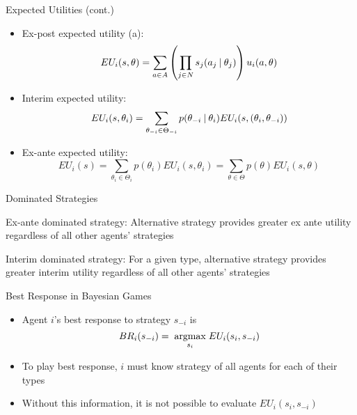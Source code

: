 \documentclass[11pt,aspectratio=169]{beamer}
\begin{document}
  \begin{frame}{Expected Utilities (cont.)}
   \begin{itemize}[<+->]
    \item \alert{Ex-post} expected utility (a):
    $$EU_i(s,\theta) = \sum_{a\in A}\left(\prod_{j\in N}s_j(a_j \:\vert\: \theta_j)\right) u_i(a,\theta)$$
    \item \alert{Interim} expected utility:
    $$EU_i(s,\theta_i) = \sum_{\theta_{-i}\in \Theta_{-i}} p(\theta_{-i} \:\vert\: \theta_i) EU_i(s, (\theta_i,\theta_{-i}))$$
    \item \alert{Ex-ante} expected utility:
    $$EU_i(s)=\sum_{\theta_i \in \Theta_i} p(\theta_i) EU_i(s,\theta_i) = \sum_{\theta \in \Theta} p(\theta) EU_i(s, \theta)$$
   \end{itemize}
  \end{frame}
  
  
  \begin{frame}{Dominated Strategies}
   \begin{itemizes}[1.5em]
    \item \alert{Ex-ante dominated strategy}: Alternative strategy provides greater ex ante utility regardless of all other agents' strategies
    \item \alert{Interim dominated strategy}: For a given type, alternative strategy provides greater interim utility regardless of all other agents' strategies
   \end{itemizes}
  \end{frame}


  \begin{frame}{Best Response in Bayesian Games}
   \begin{itemize}
   \setlength{\itemsep}{1.2em}
    \item Agent $i$'s \alert{best response} to strategy $s_{-i}$ is
    $$BR_i(s_{-i}) = \; \underset{s_i}{\operatorname*{argmax}} \; EU_i(s_i,s_{-i})$$
    \item To play best response, $i$ must know strategy of \alert{all agents} for \alert{each of their types}
    \item Without this information, it is not possible to evaluate $EU_i(s_i, s_{-i})$
   \end{itemize}
  \end{frame}
  
\end{document}

